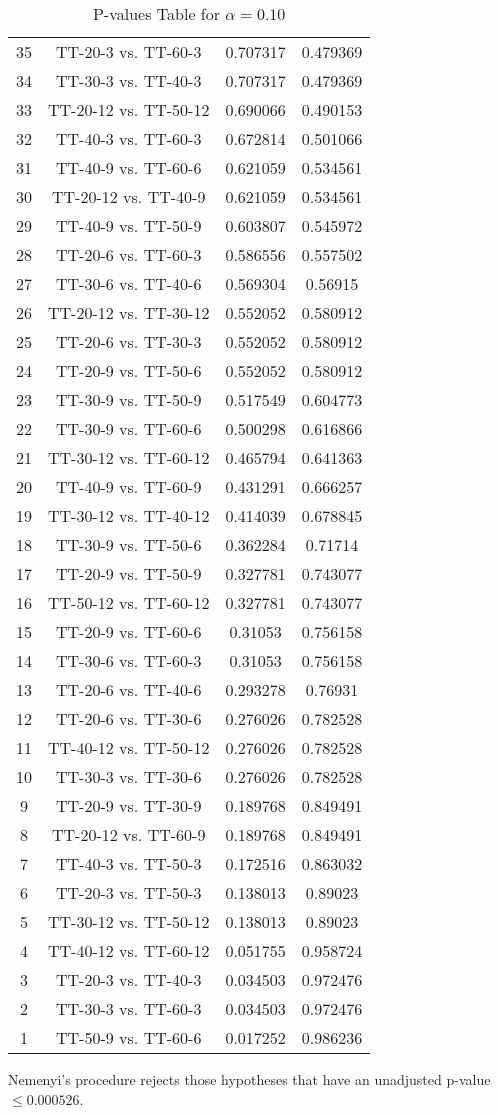 \documentclass[a4paper,10pt]{article}
\begin{document}
\begin{landscape}
\begin{table}[!htp]
\begin{tabular}{cccc}
35&TT-20-3 vs. TT-60-3&0.707317&0.479369\\
34&TT-30-3 vs. TT-40-3&0.707317&0.479369\\
33&TT-20-12 vs. TT-50-12&0.690066&0.490153\\
32&TT-40-3 vs. TT-60-3&0.672814&0.501066\\
31&TT-40-9 vs. TT-60-6&0.621059&0.534561\\
30&TT-20-12 vs. TT-40-9&0.621059&0.534561\\
29&TT-40-9 vs. TT-50-9&0.603807&0.545972\\
28&TT-20-6 vs. TT-60-3&0.586556&0.557502\\
27&TT-30-6 vs. TT-40-6&0.569304&0.56915\\
26&TT-20-12 vs. TT-30-12&0.552052&0.580912\\
25&TT-20-6 vs. TT-30-3&0.552052&0.580912\\
24&TT-20-9 vs. TT-50-6&0.552052&0.580912\\
23&TT-30-9 vs. TT-50-9&0.517549&0.604773\\
22&TT-30-9 vs. TT-60-6&0.500298&0.616866\\
21&TT-30-12 vs. TT-60-12&0.465794&0.641363\\
20&TT-40-9 vs. TT-60-9&0.431291&0.666257\\
19&TT-30-12 vs. TT-40-12&0.414039&0.678845\\
18&TT-30-9 vs. TT-50-6&0.362284&0.71714\\
17&TT-20-9 vs. TT-50-9&0.327781&0.743077\\
16&TT-50-12 vs. TT-60-12&0.327781&0.743077\\
15&TT-20-9 vs. TT-60-6&0.31053&0.756158\\
14&TT-30-6 vs. TT-60-3&0.31053&0.756158\\
13&TT-20-6 vs. TT-40-6&0.293278&0.76931\\
12&TT-20-6 vs. TT-30-6&0.276026&0.782528\\
11&TT-40-12 vs. TT-50-12&0.276026&0.782528\\
10&TT-30-3 vs. TT-30-6&0.276026&0.782528\\
9&TT-20-9 vs. TT-30-9&0.189768&0.849491\\
8&TT-20-12 vs. TT-60-9&0.189768&0.849491\\
7&TT-40-3 vs. TT-50-3&0.172516&0.863032\\
6&TT-20-3 vs. TT-50-3&0.138013&0.89023\\
5&TT-30-12 vs. TT-50-12&0.138013&0.89023\\
4&TT-40-12 vs. TT-60-12&0.051755&0.958724\\
3&TT-20-3 vs. TT-40-3&0.034503&0.972476\\
2&TT-30-3 vs. TT-60-3&0.034503&0.972476\\
1&TT-50-9 vs. TT-60-6&0.017252&0.986236\\
\hline
\end{tabular}
\caption{P-values Table for $\alpha=0.10$}
\end{table}Nemenyi's procedure rejects those hypotheses that have an unadjusted p-value $\le0.000526$.


\end{landscape}
\end{document}
